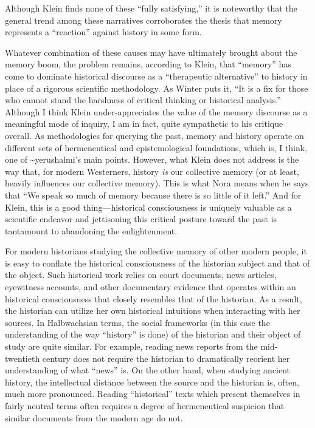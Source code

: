 Although Klein finds none of these ``fully satisfying,'' it is
noteworthy that the general trend among these narratives corroborates
the thesis that memory represents a ``reaction'' against history in some
form.

Whatever combination of these causes may have ultimately brought about
the memory boom, the problem remains, according to Klein, that
``memory'' has come to dominate historical discourse as a ``therapeutic
alternative'' to history in place of a rigorous scientific
methodology.\autocite[137]{klein2011} As Winter puts it, ``It is a fix
for those who cannot stand the harshness of critical thinking or
historical analysis.''\autocite[283]{winter2006} Although I think Klein
under-appreciates the value of the memory discourse as a meaningful mode
of inquiry, I am in fact, quite sympathetic to his critique overall. As
methodologies for querying the past, memory and history operate on
different sets of hermeneutical and epistemological foundations, which
is, I think, one of \textasciitilde{}yerushalmi's main points. However,
what Klein does not address is the way that, for modern Westerners,
history \emph{is} our collective memory (or at least, heavily influences
our collective memory). This is what Nora means when he says that ``We
speak so much of memory because there is so little of it
left.''\autocite{nora1984} And for Klein, this is a good
thing---historical consciousness is uniquely valuable as a scientific
endeavor and jettisoning this critical posture toward the past is
tantamount to abandoning the enlightenment.

For modern historians studying the collective memory of other modern
people, it is easy to conflate the historical consciousness of the
historian subject and that of the object. Such historical work relies on
court documents, news articles, eyewitness accounts, and other
documentary evidence that operates within an historical consciousness
that closely resembles that of the historian. As a result, the historian
can utilize her own historical intuitions when interacting with her
sources. In Halbwachsian terms, the social frameworks (in this case the
understanding of the way ``history'' is done) of the historian and their
object of study are quite similar. For example, reading news reports
from the mid-twentieth century does not require the historian to
dramatically reorient her understanding of what ``news'' is. On the
other hand, when studying ancient history, the intellectual distance
between the source and the historian is, often, much more pronounced.
Reading ``historical'' texts which present themselves in fairly neutral
terms often requires a degree of hermeneutical suspicion that similar
documents from the modern age do not.

